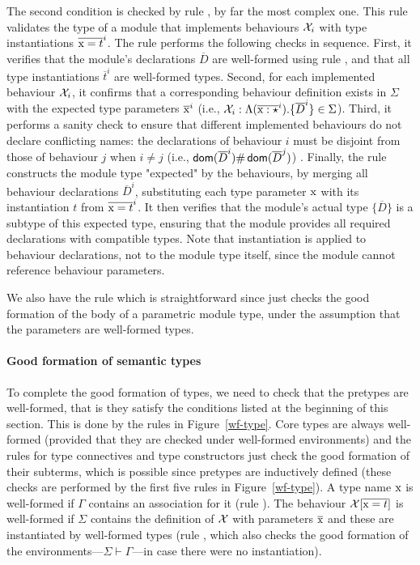 \documentclass[a4paper,10pt]{article}
\begin{document}
The second condition is checked by rule , by far the most complex one. This rule validates the type of a module that implements behaviours $\mathcal{X}_i$ with type instantiations $\overline{\text{\rm x}=t}^i$. 
The rule performs the following checks in sequence.
First, it verifies that the module's declarations $\overline{D}$ are well-formed using rule , and that all type instantiations $\overline{t}^i$ are well-formed types.
Second, for each implemented behaviour $\mathcal{X}_i$, it confirms that a corresponding behaviour definition exists in $\Sigma$ with the expected type parameters $\overline{\text{\rm x}}^i$ (i.e., $\mathcal{X}_i:\Lambda(\overline{\text{\rm x}:\star}^i).\{\overline{D}^i\}\in\Sigma$).
Third, it performs a sanity check to ensure that different implemented behaviours do not declare conflicting names: the declarations of behaviour $i$ must be disjoint from those of behaviour $j$ when $i\neq j$ (i.e., $\operatorname{\textsf{dom}}(\overline{D}^i)\#\operatorname{\textsf{dom}}(\overline{D}^j)$)  . Finally, the rule constructs the module type "expected" by the behaviours, by merging all behaviour declarations $\overline{D}^i$, substituting each type parameter $\text{\rm x}$ with its instantiation $t$ from $\overline{\text{\rm x}=t}^i$. It then verifies that the module's actual type $\{\overline{D}\}$ is a subtype of this expected type, ensuring that the module provides all required declarations with compatible types. Note that instantiation is applied to behaviour declarations, not to the module type itself, since the module cannot reference behaviour parameters.


We also have the rule  which is straightforward since just checks the good formation of the body of a parametric module type, under the assumption that the parameters are well-formed types.


\paragraph{Good formation of semantic types} To complete the good formation of types, we need to check that the pretypes are well-formed, that is they satisfy the conditions listed at the beginning of this section. This is done by the rules in Figure~\ref{wf-type}.
Core types are always well-formed (provided that they are checked under well-formed environments) and the rules for type connectives and type constructors just check the good formation of their subterms, which is possible since pretypes are inductively defined (these checks are performed by the first five rules in Figure~\ref{wf-type}).
A type name $\text{\rm x}$ is well-formed if $\Gamma$ contains an association for it (rule ). 
The behaviour $\mathcal{X}[\overline{\text{\rm x}=t}]$ is well-formed if $\Sigma$ contains the definition of $\mathcal{X}$ with parameters $\overline{\text{\rm x}}$ and these are instantiated by well-formed types (rule , which also checks the good formation of the environments---$\Sigma\vdash\Gamma$---in case there were no instantiation).
\end{document}
